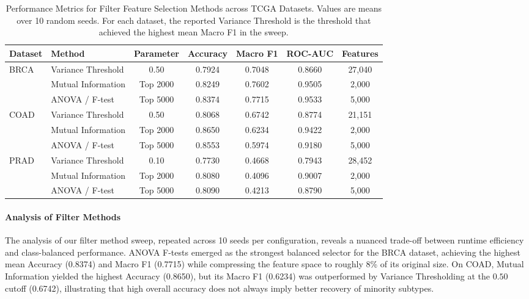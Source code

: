 \documentclass{article}
\begin{document}
\begin{table}[htbp]
\centering
\caption{Performance Metrics for Filter Feature Selection Methods across TCGA Datasets. Values are means over 10 random seeds. For each dataset, the reported Variance Threshold is the threshold that achieved the highest mean Macro F1 in the sweep.}
\label{tab:filter_metrics}
\begin{tabular}{@{}llccccc@{}}
\toprule
\textbf{Dataset} & \textbf{Method} & \textbf{Parameter} & \textbf{Accuracy} & \textbf{Macro F1} & \textbf{ROC-AUC} & \textbf{Features} \\
\midrule
\multirow{3}{*}{BRCA}
& Variance Threshold & 0.50      & 0.7924 & 0.7048 & 0.8660     & 27,040 \\
& Mutual Information & Top 2000  & 0.8249 & 0.7602 & 0.9505     & 2,000 \\
& ANOVA / F-test     & Top 5000  & 0.8374 & 0.7715 & 0.9533     & 5,000 \\
\midrule
\multirow{3}{*}{COAD}
& Variance Threshold & 0.50      & 0.8068 & 0.6742 & 0.8774     & 21,151 \\
& Mutual Information & Top 2000  & 0.8650 & 0.6234 & 0.9422     & 2,000 \\
& ANOVA / F-test     & Top 5000  & 0.8553 & 0.5974 & 0.9180     & 5,000 \\
\midrule
\multirow{3}{*}{PRAD}
& Variance Threshold & 0.10      & 0.7730 & 0.4668 & 0.7943     & 28,452 \\
& Mutual Information & Top 2000  & 0.8080 & 0.4096 & 0.9007     & 2,000 \\
& ANOVA / F-test     & Top 5000  & 0.8090 & 0.4213 & 0.8790     & 5,000 \\
\bottomrule
\end{tabular}
\end{table}

\paragraph{Analysis of Filter Methods}
The analysis of our filter method sweep, repeated across 10 seeds per configuration, reveals a nuanced trade-off between runtime efficiency and class-balanced performance. ANOVA F-tests emerged as the strongest balanced selector for the BRCA dataset, achieving the highest mean Accuracy (0.8374) and Macro F1 (0.7715) while compressing the feature space to roughly 8\% of its original size. On COAD, Mutual Information yielded the highest Accuracy (0.8650), but its Macro F1 (0.6234) was outperformed by Variance Thresholding at the $0.50$ cutoff (0.6742), illustrating that high overall accuracy does not always imply better recovery of minority subtypes.
\end{document}
